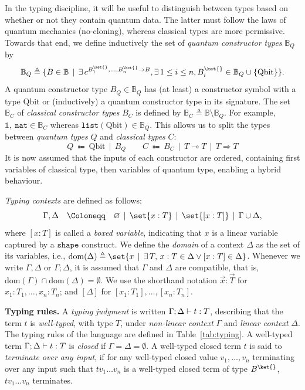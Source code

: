 \documentclass[10pt,a4paper]{article}
\newcommand{\cvar}{C}
\newcommand{\bqvar}{B_Q}
\newcommand{\bcvar}{B_C}
\newcommand{\bvar}{B}
\newcommand{\qvar}{Q}
\newcommand\bkvar{\bvar^{\ket{}}}
\newcommand{\qbit}{\mathrm{Qbit}}
\newcommand{\nonlinfunc}{\Rightarrow}
\newcommand{\linfunc}{\multimap}
\newcommand{\bset}{\mathbb{B}}
\newcommand{\bcset}{\mathbb{B}_C}
\newcommand{\bqset}{\mathbb{B}_Q}
\newcommand{\unit}{\mathbb 1}
\newcommand{\nat}{\mathtt{nat}}
\newcommand{\typelist}[1]{\mathtt{list}(#1)}
\newcommand{\sign}[2]{\ifx&#1&
  \else
  #1 \to
  \fi
#2}
\newcommand{\signdefault}{\sign {\bkvar_1, \dots, \bkvar_n} \bvar}
\newcommand{\textshape}{\ensuremath{\mathtt{shape}}}
\newcommand{\vartyping}[2]{#1 : #2}
\newcommand{\typing}[4]{
  \ifx&#1&\varnothing \else #1\fi; 
  \ifx&#2&\varnothing \else #2\fi 
  \vdash {#3} : #4
}
\newcommand{\shapemarker}[1]{[#1]}
\newcommand{\typedom}[1]{\mathrm{dom}(#1)}
\newcommand{\gmid}{\,\mid\,}
\newcommand{\seq}[1]{\overrightarrow{#1}}
\begin{document}
In the typing discipline, it will be useful to distinguish between
types based on whether or not they contain quantum data. The latter
must follow the laws of quantum mechanics (no-cloning), whereas
classical types are more permissive.
Towards that end, we define inductively the set of \emph{quantum constructor
types} $\bqset$ by 
\[
  \bqset \triangleq \{\bvar \in \bset \gmid
    \exists\,c^{\signdefault}, \exists\,1 \leq
i \leq n, \bkvar_i \in \bqset \cup \{ \qbit\}\}. 
\]
A quantum
constructor type $\bvar_\qvar \in \bqset$ has (at least) a
constructor symbol with a type $\qbit$ or (inductively) a quantum
constructor type in its signature.
The set $\bcset$ of \emph{classical constructor types} $\bvar_\cvar$
is defined by $\bcset \triangleq \bset \setminus \bqset$.
For example, $\unit,\ \nat \in \bcset$ whereas $\typelist{\qbit} \in \bqset$.
This allows us to split the types between \emph{quantum types} $\qvar$ and
\emph{classical types} $\cvar$:
\[
  \qvar \ \Coloneqq \ \qbit \gmid \bqvar
  \qquad
  \cvar \ \Coloneqq \ \bcvar \gmid T \linfunc T \gmid T \nonlinfunc T
\]
It is now assumed that the inputs of each constructor are ordered, containing
first variables of classical type, then variables of quantum type, enabling a
hybrid behaviour.

\emph{Typing contexts} are defined as follows:
\[
  \Gamma, \Delta \quad \Coloneqq \quad \varnothing \gmid \set{x : T}
  \gmid \set{\shapemarker{x : T}} \gmid \Gamma \cup \Delta,
\]
where $\shapemarker{x : T}$ is called a \emph{boxed variable},
indicating that $x$ is a linear variable captured by a \textshape{} construct.
We define the \emph{domain} of a context $\Delta$ as the set of its variables,
i.e., $\typedom \Delta \triangleq \set{x \gmid \exists\,T,\,x : T
\in \Delta \vee \shapemarker{x : T} \in \Delta}$.
Whenever we write $\Gamma, \Delta$ or
$\Gamma;\Delta$, it is assumed that $\Gamma$ and $\Delta$ are compatible, that
is, $\typedom \Gamma \cap \typedom \Delta = \emptyset$.
We use the shorthand notation $\vartyping {\seq x} {\seq T}$ for $\vartyping
{x_1}{T_1}, \dots, \vartyping {x_n}{T_n}$; and $\shapemarker \Delta$ for
$\shapemarker{x_1 : T_1}, \dots, \shapemarker{x_n : T_n}$.

\medskip
\noindent
\textbf{Typing rules. }
A \emph{typing judgment} is written $\typing \Gamma \Delta t T$, describing
that the term $t$ is \emph{well-typed}, with type $T$, under \emph{non-linear
context} $\Gamma$ and \emph{linear context} $\Delta$.
The typing rules of the language are defined in Table~\ref{tab:typing}.
A well-typed term $\typing \Gamma \Delta t T$ is \emph{closed} if $\Gamma =
\Delta = \emptyset$.
A well-typed closed term $t$ is said to \emph{terminate over any input}, if for
any well-typed closed value $v_1, \dots, v_n$ terminating over any input such
that $tv_1\dots v_n$ is a well-typed closed term of type $\bkvar$, $tv_1 \dots
v_n$ terminates.
\end{document}
